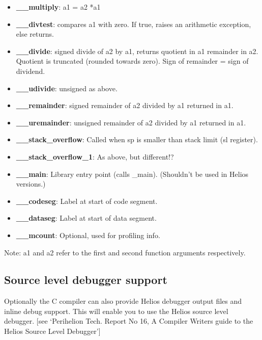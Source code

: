 \begin{itemize}
\item {\bf \_\_multiply}: a1 = a2 *a1

\item {\bf \_\_divtest}: compares a1 with zero. If true, raises an arithmetic 
exception, else returns.

\item {\bf \_\_divide}:	signed divide of a2 by a1, returns quotient in a1
remainder in a2. Quotient is truncated (rounded towards zero). Sign of 
remainder = sign of dividend.

\item {\bf \_\_udivide}: unsigned as above.

\item {\bf \_\_remainder}: signed remainder of a2 divided by a1 returned in a1.

\item {\bf \_\_uremainder}: unsigned remainder of a2 divided by a1 returned in a1.

\item {\bf \_\_stack\_overflow}: Called when sp is smaller than stack limit 
(sl register).

\item {\bf \_\_stack\_overflow\_1}: As above, but different!?

\item {\bf \_\_main}: Library entry point (calls \_main). (Shouldn't be used 
in Helios versions.)

\item {\bf \_\_codeseg}: Label at start of code segment.

\item {\bf \_\_dataseg}: Label at start of data segment.

\item {\bf \_\_mcount}: Optional, used for profiling info.
\end{itemize}

Note: a1 and a2 refer to the first and second function arguments respectively.

\subsection{Source level debugger support}

Optionally the C compiler can also provide Helios debugger output files and
inline debug support. This will enable you to use the Helios source level
debugger. [see `Perihelion Tech. Report No 16, A Compiler Writers guide to the
Helios Source Level Debugger']

